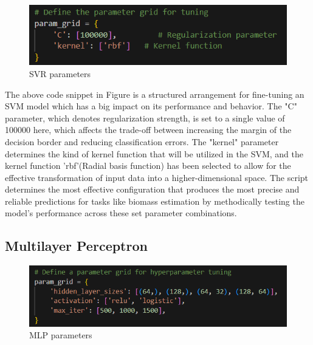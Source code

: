 \documentclass[a4paper,12pt]{report}%
\renewcommand{\\}{\vspace*{0.5\baselineskip} \newline}
\begin{document}
\begin{figure}[h]
\centering
	\includegraphics[scale=0.95]{images/svr param.png}\\
	\begin{footnotesize}
		\caption{SVR parameters}
		\label{SVR parameters}
	\end{footnotesize}
\end{figure}

\noindent The above code snippet in Figure \cite{SVR parameters} is a structured arrangement for fine-tuning an SVM model which has a big impact on its performance and behavior. The "C" parameter, which denotes regularization strength, is set to a single value of 100000 here, which affects the trade-off between increasing the margin of the decision border and reducing classification errors.
The "kernel" parameter determines the kind of kernel function that will be utilized in the SVM, and the kernel function 'rbf'(Radial basis function) has been selected to allow for the effective transformation of input data into a higher-dimensional space.
The script determines the most effective configuration that produces the most precise and reliable predictions for tasks like biomass estimation by methodically testing the model's performance across these set parameter combinations.

\subsection{Multilayer Perceptron}

\begin{figure}[h]
\centering
	\includegraphics[scale=0.95]{images/mlp param.png}\\
	\begin{footnotesize}
		\caption{MLP parameters}
		\label{MLP parameters}
	\end{footnotesize}
\end{figure}
\end{document}
